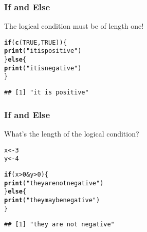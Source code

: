 \documentclass[12pt]{beamer}\usepackage[]{graphicx}\usepackage[]{color}
\makeatletter
\newcommand{\hlnum}[1]{\textcolor[rgb]{0.686,0.059,0.569}{#1}}%
\newcommand{\hlstr}[1]{\textcolor[rgb]{0.192,0.494,0.8}{#1}}%
\newcommand{\hlopt}[1]{\textcolor[rgb]{0,0,0}{#1}}%
\newcommand{\hlstd}[1]{\textcolor[rgb]{0.345,0.345,0.345}{#1}}%
\newcommand{\hlkwa}[1]{\textcolor[rgb]{0.161,0.373,0.58}{\textbf{#1}}}%
\newcommand{\hlkwb}[1]{\textcolor[rgb]{0.69,0.353,0.396}{#1}}%
\newcommand{\hlkwd}[1]{\textcolor[rgb]{0.737,0.353,0.396}{\textbf{#1}}}%
\newenvironment{kframe}{%
 \def\at@end@of@kframe{}%
 \ifinner\ifhmode%
  \def\at@end@of@kframe{\end{minipage}}%
  \begin{minipage}{\columnwidth}%
 \fi\fi%
 \def\FrameCommand##1{\hskip\@totalleftmargin \hskip-\fboxsep
 \colorbox{shadecolor}{##1}\hskip-\fboxsep
     \hskip-\linewidth \hskip-\@totalleftmargin \hskip\columnwidth}%
 \MakeFramed {\advance\hsize-\width
   \@totalleftmargin\z@ \linewidth\hsize
   \@setminipage}}%
 {\par\unskip\endMakeFramed%
 \at@end@of@kframe}
\newenvironment{knitrout}{}{} %
\makeatother
\begin{document}

\begin{frame}[fragile]
\frametitle{If and Else}

The logical condition must be of length one!
\begin{knitrout}\footnotesize
{}\color{fgcolor}\begin{kframe}
\begin{alltt}
\hlkwa{if} \hlstd{(}\hlkwd{c}\hlstd{(}\hlnum{TRUE}\hlstd{,} \hlnum{TRUE}\hlstd{)) \{}
  \hlkwd{print}\hlstd{(}\hlstr{"it is positive"}\hlstd{)}
\hlstd{\}} \hlkwa{else} \hlstd{\{}
  \hlkwd{print}\hlstd{(}\hlstr{"it is negative"}\hlstd{)}
\hlstd{\}}
\end{alltt}


{\ttfamily\noindent{}}\begin{verbatim}
## [1] "it is positive"
\end{verbatim}
\end{kframe}
\end{knitrout}

\end{frame}


\begin{frame}[fragile]
\frametitle{If and Else}

What's the length of the logical condition?
\begin{knitrout}\footnotesize
{}\color{fgcolor}\begin{kframe}
\begin{alltt}
\hlstd{x} \hlkwb{<-} \hlnum{3}
\hlstd{y} \hlkwb{<-} \hlnum{4}

\hlkwa{if} \hlstd{(x} \hlopt{>} \hlnum{0} \hlopt{&} \hlstd{y} \hlopt{>} \hlnum{0}\hlstd{) \{}
  \hlkwd{print}\hlstd{(}\hlstr{"they are not negative"}\hlstd{)}
\hlstd{\}} \hlkwa{else} \hlstd{\{}
  \hlkwd{print}\hlstd{(}\hlstr{"they may be negative"}\hlstd{)}
\hlstd{\}}
\end{alltt}
\begin{verbatim}
## [1] "they are not negative"
\end{verbatim}
\end{kframe}
\end{knitrout}

\end{frame}
\end{document}

